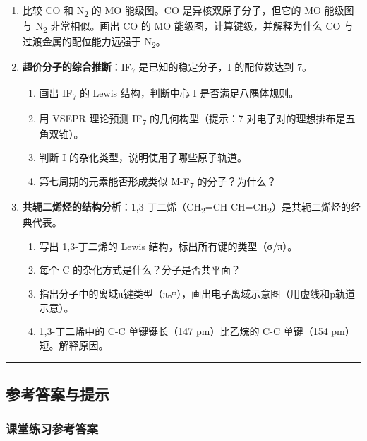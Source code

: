 \documentclass[a4paper,11pt]{ctexart}
\providecommand{\tightlist}{\setlength{\itemsep}{0pt}\setlength{\parskip}{0pt}}
\begin{document}
\begin{enumerate}
\def\labelenumi{\arabic{enumi}.}
\setcounter{enumi}{8}
\item
  比较 CO 和 N\textsubscript{2} 的 MO 能级图。CO 是异核双原子分子，但它的 MO 能级图与 N\textsubscript{2} 非常相似。画出 CO 的 MO 能级图，计算键级，并解释为什么 CO 与过渡金属的配位能力远强于 N\textsubscript{2}。
\item
  \textbf{超价分子的综合推断}：IF\textsubscript{7} 是已知的稳定分子，I 的配位数达到 7。

  \begin{enumerate}
  \def\labelenumii{(\arabic{enumii})}
  \tightlist
  \item
    画出 IF\textsubscript{7} 的 Lewis 结构，判断中心 I 是否满足八隅体规则。
  \item
    用 VSEPR 理论预测 IF\textsubscript{7} 的几何构型（提示：7 对电子对的理想排布是五角双锥）。
  \item
    判断 I 的杂化类型，说明使用了哪些原子轨道。
  \item
    第七周期的元素能否形成类似 M-F\textsubscript{7} 的分子？为什么？
  \end{enumerate}
\item
  \textbf{共轭二烯烃的结构分析}：1,3-丁二烯（CH\textsubscript{2}=CH-CH=CH\textsubscript{2}）是共轭二烯烃的经典代表。

  \begin{enumerate}
  \def\labelenumii{(\arabic{enumii})}
  \tightlist
  \item
    写出 1,3-丁二烯的 Lewis 结构，标出所有键的类型（σ/π）。
  \item
    每个 C 的杂化方式是什么？分子是否共平面？
  \item
    指出分子中的离域π键类型（πₙᵐ），画出电子离域示意图（用虚线和p轨道示意）。
  \item
    1,3-丁二烯中的 C-C 单键键长（147 pm）比乙烷的 C-C 单键（154 pm）短。解释原因。
  \end{enumerate}
\end{enumerate}

\begin{center}\rule{0.5\linewidth}{0.5pt}\end{center}

\subsection{参考答案与提示}\label{ux53c2ux8003ux7b54ux6848ux4e0eux63d0ux793a}

\subsubsection{课堂练习参考答案}\label{ux8bfeux5802ux7ec3ux4e60ux53c2ux8003ux7b54ux6848}
\end{document}
